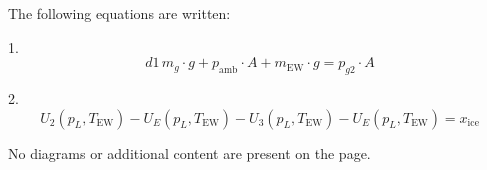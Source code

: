 The following equations are written:

1.  
\[
d1 \, m_{g} \cdot g + p_{\text{amb}} \cdot A + m_{\text{EW}} \cdot g = p_{g2} \cdot A
\]

2.  
\[
U_2(p_{L}, T_{\text{EW}}) - U_E(p_{L}, T_{\text{EW}}) - U_3(p_{L}, T_{\text{EW}}) - U_E(p_{L}, T_{\text{EW}}) = x_{\text{ice}}
\]  

No diagrams or additional content are present on the page.